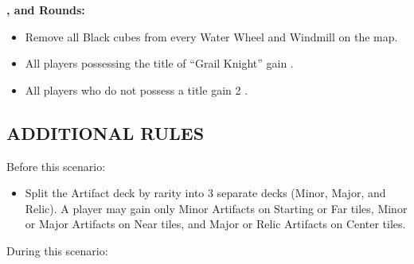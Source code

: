 \begin{multicols*}{2}
\textbf{,  and  Rounds:}
\begin{itemize}
  \item Remove all Black cubes from every Water Wheel and Windmill on the map.
  \item All players possessing the title of ``\textcolor{cobalt}{Grail Knight}'' gain .
  \item All players who do not possess a title gain 2 .
\end{itemize}

\subsection*{\MakeUppercase{Additional Rules}}
Before this scenario:

\begin{itemize}
  \item Split the Artifact deck by rarity into 3 separate decks (Minor, Major, and Relic). A player may gain only Minor Artifacts on Starting or Far tiles, Minor or Major Artifacts on Near tiles, and Major or Relic Artifacts on Center tiles.
\end{itemize}

During this scenario:


\end{multicols*}
